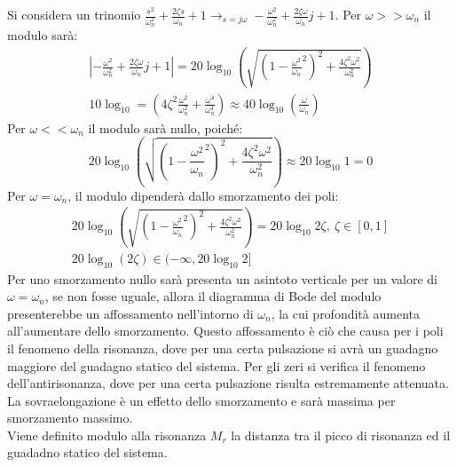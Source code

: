 \documentclass{article}
\numberwithin{equation}{subsection}
\begin{document}
Si considera un trinomio $\displaystyle\frac{s^2}{\omega_n^2}+\frac{2\zeta s}{\omega_n}+1\to_{s=j\omega}-\frac{\omega^2}{\omega_n^2}+\frac{2\zeta\omega}{\omega_n}j+1$. 
Per $\omega>>\omega_n$ il modulo sarà: 
\begin{gather}
    \left|-\frac{\omega^2}{\omega_n^2}+\frac{2\zeta\omega}{\omega_n}j+1\right|=20\log_{10}\left(\sqrt{\left(1-\displaystyle\frac{\omega^2}{\omega_n}^2\right)^2+\frac{4\zeta^2\omega^2}{\omega_n^2}}\right)\\
    10\log_{10}=\left(4\zeta^2\displaystyle\frac{\omega^2}{\omega_n^2}+\frac{\omega^4}{\omega_n^4}\right)\approx40\log_{10}\left(\displaystyle\frac{\omega}{\omega_n}\right)
\end{gather}
Per $\omega<<\omega_n$ il modulo sarà nullo, poiché: 
\begin{equation}
    20\log_{10}\left(\sqrt{\left(1-\displaystyle\frac{\omega^2}{\omega_n}^2\right)^2+\frac{4\zeta^2\omega^2}{\omega_n^2}}\right)\approx20\log_{10}1=0
\end{equation}
Per $\omega=\omega_n$, il modulo dipenderà dallo smorzamento dei poli:
\begin{gather}
    20\log_{10}\left(\sqrt{\left(1-\displaystyle\frac{\omega^2}{\omega_n}^2\right)^2+\frac{4\zeta^2\omega^2}{\omega_n^2}}\right)=20\log_{10}2\zeta,\:\zeta\in[0,1]\\
    20\log_{10}(2\zeta)\in(-\infty,20\log_{10}2]
\end{gather}
Per uno smorzamento nullo sarà presenta un asintoto verticale per un valore di $\omega=\omega_n$, se non fosse uguale, allora il diagramma di Bode del modulo presenterebbe 
un affossamento nell'intorno di $\omega_n$, la cui profondità aumenta all'aumentare dello smorzamento. Questo affossamento è ciò che causa per i poli il fenomeno della 
risonanza, dove per una certa pulsazione si avrà un guadagno maggiore del guadagno statico del sistema. Per gli zeri si verifica il fenomeno dell'antirisonanza, dove 
per una certa pulsazione risulta estremamente attenuata. La sovraelongazione è un effetto dello smorzamento e sarà massima per smorzamento massimo.
\\
Viene definito modulo alla risonanza $M_r$ la distanza tra il picco di risonanza ed il guadadno statico del sistema. 

\begin{center}
\end{center}
\end{document}
